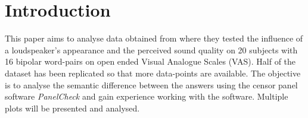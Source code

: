 \chapter*{Introduction}
\label{introduction}
This paper aims to analyse data obtained from \cite{Christiansen2011} where they tested the influence of a loudspeaker's appearance and the perceived sound quality on 20 subjects with 16 bipolar word-pairs on open ended Visual Analogue Scales (VAS). Half of the dataset has been replicated so that more data-points are available. The objective is to analyse the semantic difference between the answers using the censor panel software \textit{PanelCheck} and gain experience working with the software. Multiple plots will be presented and analysed.

